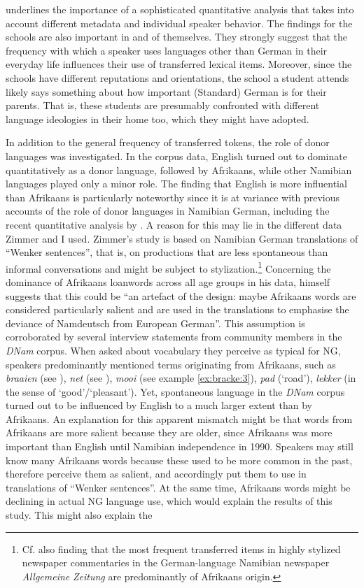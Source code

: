 \documentclass[output=paper]{langsci/langscibook}
\begin{document}
underlines the importance of a sophisticated quantitative analysis that takes into account different metadata and individual speaker behavior. The findings for the schools are also important in and of themselves. They strongly suggest that the frequency with which a speaker uses languages other than German in their everyday life influences their use of transferred lexical items. Moreover, since the schools have different reputations and orientations, the school a student attends likely says something about how important (Standard) German is for their parents. That is, these students are presumably confronted with different language ideologies in their home too, which they might have adopted.

In addition to the general frequency of transferred tokens, the role of donor languages was investigated. In the corpus data, English turned out to dominate quantitatively as a donor language, followed by Afrikaans, while other Namibian languages played only a minor role. The finding that English is more influential than Afrikaans is particularly noteworthy since it is at variance with previous accounts of the role of donor languages in Namibian German, including the recent quantitative analysis by \citet{zimmer_linguisticvar_toappear}. A reason for this may lie in the different data Zimmer and I used. Zimmer’s study is based on Namibian German translations of “Wenker sentences”, that is, on productions that are less spontaneous than informal conversations and might be subject to stylization.\footnote{Cf. also  finding that the most frequent transferred items in highly stylized newspaper commentaries in the German-language Namibian newspaper \textit{Allgemeine} \textit{Zeitung} are predominantly of Afrikaans origin.} Concerning the dominance of Afrikaans loanwords across all age groups in his data, \citet{zimmer_linguisticvar_toappear} himself suggests that this could be “an artefact of the design: maybe Afrikaans words are considered particularly salient and are used in the translations to emphasise the deviance of Namdeutsch from European German”. This assumption is corroborated by several interview statements from community members in the \textit{DNam} corpus. When asked about vocabulary they perceive as typical for NG, speakers predominantly mentioned terms originating from Afrikaans, such as \textit{braaien} (see ), \textit{net} (see ), \textit{mooi} (see example \ref{ex:bracke:3}), \textit{pad} (‘road’), \textit{lekker} (in the sense of ‘good’/‘pleasant’). Yet, spontaneous language in the \textit{DNam} corpus turned out to be influenced by English to a much larger extent than by Afrikaans. An explanation for this apparent mismatch might be that words from Afrikaans are more salient because they are older, since Afrikaans was more important than English until Namibian independence in 1990. Speakers may still know many Afrikaans words because these used to be more common in the past, therefore perceive them as salient, and accordingly put them to use in translations of “Wenker sentences”. At the same time, Afrikaans words might be declining in actual NG language use, which would explain the results of this study. This might also explain the 
\end{document}
